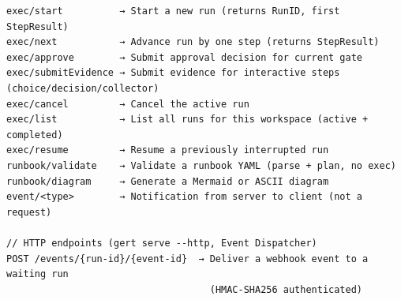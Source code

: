 \begin{verbatim}
exec/start          → Start a new run (returns RunID, first StepResult)
exec/next           → Advance run by one step (returns StepResult)
exec/approve        → Submit approval decision for current gate
exec/submitEvidence → Submit evidence for interactive steps (choice/decision/collector)
exec/cancel         → Cancel the active run
exec/list           → List all runs for this workspace (active + completed)
exec/resume         → Resume a previously interrupted run
runbook/validate    → Validate a runbook YAML (parse + plan, no exec)
runbook/diagram     → Generate a Mermaid or ASCII diagram
event/<type>        → Notification from server to client (not a request)

// HTTP endpoints (gert serve --http, Event Dispatcher)
POST /events/{run-id}/{event-id}  → Deliver a webhook event to a waiting run
                                    (HMAC-SHA256 authenticated)
\end{verbatim}
